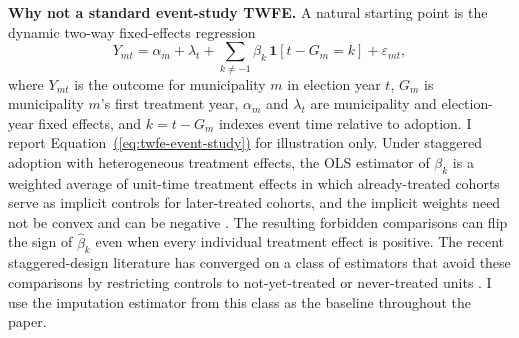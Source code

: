 \textbf{Why not a standard event-study TWFE.} A natural starting point is the dynamic two-way fixed-effects regression
\begin{equation}
\label{eq:twfe-event-study}
Y_{mt} = \alpha_m + \lambda_t + \sum_{k \neq -1} \beta_k \,\mathbf{1}\!\left[t - G_m = k\right] + \varepsilon_{mt},
\end{equation}
where $Y_{mt}$ is the outcome for municipality $m$ in election year $t$, $G_m$ is municipality $m$'s first treatment year, $\alpha_m$ and $\lambda_t$ are municipality and election-year fixed effects, and $k = t - G_m$ indexes event time relative to adoption. I report Equation~\hyperref[eq:twfe-event-study]{(\ref*{eq:twfe-event-study})} for illustration only. Under staggered adoption with heterogeneous treatment effects, the OLS estimator of $\beta_k$ is a weighted average of unit-time treatment effects in which already-treated cohorts serve as implicit controls for later-treated cohorts, and the implicit weights need not be convex and can be negative \citep{GoodmanBacon2018DifferenDifferenWith,deChaisemartin2020TwoWayFixed,Abraham2018EstimatiDynamicTreatmen}. The resulting forbidden comparisons can flip the sign of $\hat\beta_k$ even when every individual treatment effect is positive. The recent staggered-design literature has converged on a class of estimators that avoid these comparisons by restricting controls to not-yet-treated or never-treated units \citep{Callaway2020DifferenDifferenWith,Abraham2018EstimatiDynamicTreatmen,deChaisemartin2020TwoWayFixed,Borusyak2024RevisitiEventStudy}. I use the imputation estimator from this class as the baseline throughout the paper.

